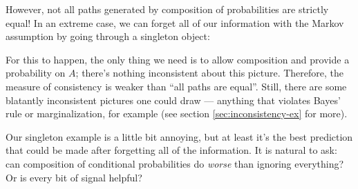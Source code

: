 \documentclass{article}
\begin{document}
	
	However, not all paths generated by composition of probabilities are strictly equal! In an extreme case, we can forget all of our information with the Markov assumption by going through a singleton object:
	
	\begin{center}
	\end{center}
	For this to happen, the only thing we need is to allow composition and provide a probability on $A$; there's nothing inconsistent about this picture. Therefore, the measure of consistency is weaker than ``all paths are equal''. Still, there are some blatantly inconsistent pictures one could draw --- anything that violates Bayes' rule or marginalization, for example (see section \ref{sec:inconsistency-ex} for more).
	
	Our singleton example is a little bit annoying, but at least it's the best prediction that could be made after forgetting all of the information. It is natural to ask: can composition of conditional probabilities do \emph{worse} than ignoring everything? Or is every bit of signal helpful? %
	
\end{document}
